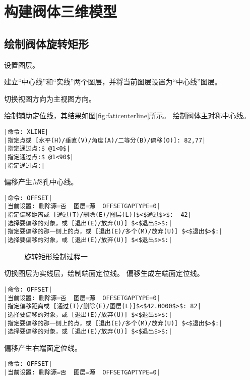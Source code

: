 \section{构建阀体三维模型}
\subsection{绘制阀体旋转矩形}
\begin{procedure}
\item 设置图层。

建立“中心线”和“实线”两个图层，并将当前图层设置为“中心线”图层。
\item 切换视图方向为主视图方向。
\item 绘制辅助定位线，其结果如图\ref{fig:faticenterline}所示。
绘制阀体主对称中心线。
\begin{lstlisting}
|命令: XLINE|
|指定点或 [水平(H)/垂直(V)/角度(A)/二等分(B)/偏移(O)]: 82,77|
|指定通过点:$ @1<0$|
|指定通过点:$ @1<90$|
|指定通过点:|
\end{lstlisting}
偏移产生$M8$孔中心线。
\begin{lstlisting}
|命令: OFFSET|
|当前设置: 删除源=否  图层=源  OFFSETGAPTYPE=0|
|指定偏移距离或 [通过(T)/删除(E)/图层(L)]$<$通过$>$:  42|
|选择要偏移的对象，或 [退出(E)/放弃(U)] $<$退出$>$:|
|指定要偏移的那一侧上的点，或 [退出(E)/多个(M)/放弃(U)] $<$退出$>$:|
|选择要偏移的对象，或 [退出(E)/放弃(U)] $<$退出$>$:|
\end{lstlisting}
\begin{figure}[htbp]
\centering
{}\hspace{30pt}
\hspace{30pt}
\caption{旋转矩形绘制过程一}
\end{figure}
\item 切换图层为实线层，绘制端面定位线。
偏移生成左端面定位线。
\begin{lstlisting}
|命令: OFFSET|
|当前设置: 删除源=否  图层=源  OFFSETGAPTYPE=0|
|指定偏移距离或 [通过(T)/删除(E)/图层(L)]$<$42.0000$>$: 82|
|选择要偏移的对象，或 [退出(E)/放弃(U)] $<$退出$>$:|
|指定要偏移的那一侧上的点，或 [退出(E)/多个(M)/放弃(U)] $<$退出$>$:|
|选择要偏移的对象，或 [退出(E)/放弃(U)] $<$退出$>$:|
\end{lstlisting}
偏移产生右端面定位线。
\begin{lstlisting}
|命令: OFFSET|
|当前设置: 删除源=否  图层=源  OFFSETGAPTYPE=0|

\end{lstlisting}
\end{procedure}
